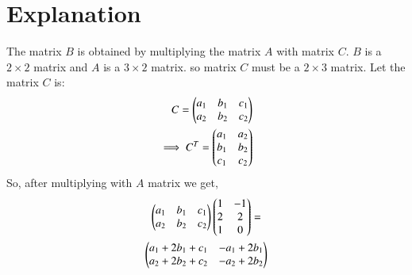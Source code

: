 \documentclass[journal,12pt,twocolumn]{IEEEtran}
\begin{document}
\section{Explanation}
The matrix $B$ is obtained by multiplying the matrix $A$ with matrix $C$. $B$ is a $2 \times 2$ matrix and $A$ is a $3 \times 2$ matrix. so matrix $C$ must be a $2 \times 3$ matrix.
Let the matrix $C$ is:
\begin{align}
C = \begin{pmatrix}a_1 & b_1 & c_1\\a_2 & b_2 & c_2\end{pmatrix}\\
\implies C^T = \begin{pmatrix}a_1 & a_2\\b_1 & b_2\\c_1 & c_2\end{pmatrix}
\end{align}
So, after multiplying with $A$ matrix we get,
\begin{multline}
\begin{pmatrix}a_1 & b_1 & c_1\\a_2 & b_2 & c_2\end{pmatrix}\begin{pmatrix}1 & -1\\2 & 2\\1 & 0\end{pmatrix} =\\ \begin{pmatrix}a_1+2b_1+c_1 & -a_1+2b_1\\a_2+2b_2+c_2 & -a_2+2b_2\end{pmatrix}  
\end{multline}
\end{document}
